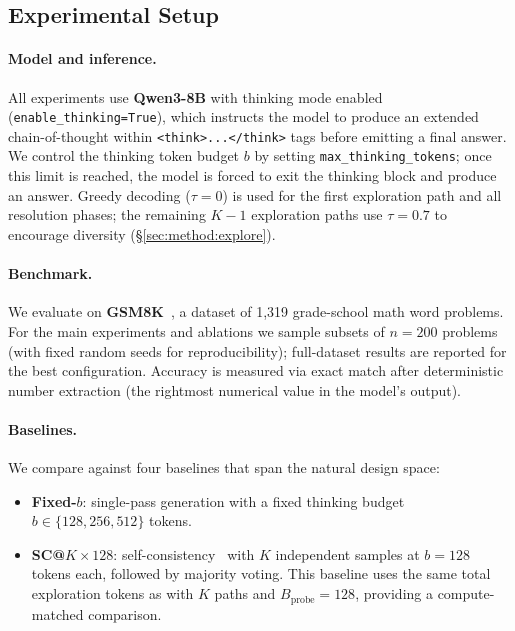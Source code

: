 
\subsection{Experimental Setup}
\label{sec:exp:setup}

\paragraph{Model and inference.}
All experiments use \textbf{Qwen3-8B} with thinking mode enabled
(\texttt{enable\_thinking=True}), which instructs the model to produce an
extended chain-of-thought within \texttt{<think>...</think>} tags before
emitting a final answer.
We control the thinking token budget $b$ by setting
\texttt{max\_thinking\_tokens}; once this limit is reached, the model is
forced to exit the thinking block and produce an answer.
Greedy decoding ($\tau = 0$) is used for the first exploration path and
all resolution phases; the remaining $K{-}1$ exploration paths use
$\tau = 0.7$ to encourage diversity (\S\ref{sec:method:explore}).

\paragraph{Benchmark.}
We evaluate on \textbf{GSM8K}~\citep{cobbe2021training}, a dataset of
1{,}319 grade-school math word problems.
For the main experiments and ablations we sample subsets of $n = 200$
problems (with fixed random seeds for reproducibility); full-dataset
results are reported for the best configuration.
Accuracy is measured via exact match after deterministic number extraction
(the rightmost numerical value in the model's output).

\paragraph{Baselines.}
We compare \method{} against four baselines that span the natural
design space:
\begin{itemize}[nosep,leftmargin=*]
  \item \textbf{Fixed-$b$}: single-pass generation with a fixed thinking
    budget $b \in \{128, 256, 512\}$ tokens.
  \item \textbf{SC@$K{\times}128$}: self-consistency~\citep{wang2023selfconsistency}
    with $K$ independent samples at $b = 128$ tokens each, followed by
    majority voting.
    This baseline uses the same total exploration tokens as \method{}
    with $K$ paths and $B_{\mathrm{probe}} = 128$, providing a
    compute-matched comparison.
\end{itemize}

